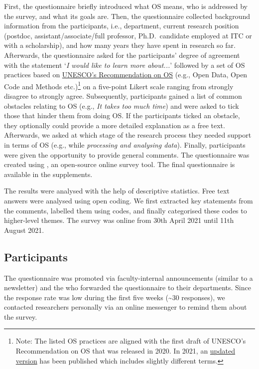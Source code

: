 \documentclass[gc, manuscript]{copernicus}
\begin{document}
First, the questionnaire briefly introduced what OS means, who is
addressed by the survey, and what its goals are. Then, the questionnaire
collected background information from the participants, i.e.,
department, current research position (postdoc, assistant/associate/full
professor, Ph.D.~candidate employed at ITC or with a scholarship), and
how many years they have spent in research so far. Afterwards, the
questionnaire asked for the participants' degree of agreement with the
statement `\textit{I would like to learn more about...}' followed by a
set of OS practices based on
\href{https://unesdoc.unesco.org/ark:/48223/pf0000374409}{UNESCO's
Recommendation on OS} (e.g., Open Data, Open Code and Methods
etc.)\footnote{Note: The listed OS practices are aligned with the first
  draft of UNESCO's Recommendation on OS that was released in 2020. In
  2021, an
  \href{https://en.unesco.org/science-sustainable-future/open-science/recommendation}{updated
  version} has been published which includes slightly different terms.}
on a five-point Likert scale ranging from strongly disagree to strongly
agree. Subsequently, participants gained a list of common obstacles
relating to OS (e.g., \textit{It takes too much time}) and were asked to
tick those that hinder them from doing OS. If the participants ticked an
obstacle, they optionally could provide a more detailed explanation as a
free text. Afterwards, we asked at which stage of the research process
they needed support in terms of OS (e.g., while
\textit{processing and analysing data}). Finally, participants were
given the opportunity to provide general comments. The questionnaire was
created using
\href{https://www.limesurvey.org/de/}{\color{blue}{LimeSurvey}}, an
open-source online survey tool. The final questionnaire is available in
the supplements.

The results were analysed with the help of descriptive statistics. Free
text answers were analysed using open coding. We first extracted key
statements from the comments, labelled them using codes, and finally
categorised these codes to higher-level themes. The survey was online
from 30th April 2021 until 11th August 2021.

\subsection{Participants}

The questionnaire was promoted via faculty-internal announcements
(similar to a newsletter) and the
\href{https://www.itc.nl/research/open-science/about/user-committee/}{\color{blue}{OS@ITC User Committee}}
who forwarded the questionnaire to their departments. Since the response
rate was low during the first five weeks (\textasciitilde30 responses),
we contacted researchers personally via an online messenger to remind
them about the survey.
\end{document}

